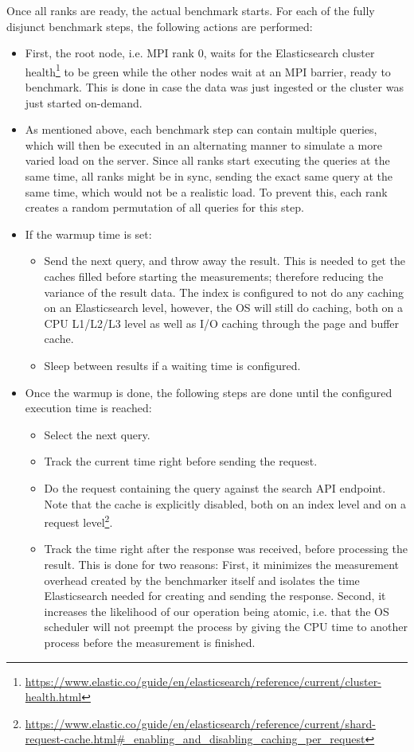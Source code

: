 Once all ranks are ready, the actual benchmark starts. For each of the fully disjunct benchmark steps, the following actions are performed:
\begin{itemize}
  \item First, the root node, i.e. \ac{MPI} rank 0, waits for the Elasticsearch cluster health\footnote{\url{https://www.elastic.co/guide/en/elasticsearch/reference/current/cluster-health.html}} to be green while the other nodes wait at an \ac{MPI} barrier, ready to benchmark. This is done in case the data was just ingested or the cluster was just started on-demand.
  \item As mentioned above, each benchmark step can contain multiple queries, which will then be executed in an alternating manner to simulate a more varied load on the server. Since all ranks start executing the queries at the same time, all ranks might be in sync, sending the exact same query at the same time, which would not be a realistic load. To prevent this, each rank creates a random permutation of all queries for this step.
  \item If the warmup time is set:
    \begin{itemize}
      \item Send the next query, and throw away the result. This is needed to get the caches filled before starting the measurements; therefore reducing the variance of the result data. The index is configured to not do any caching on an Elasticsearch level, however, the OS will still do caching, both on a CPU L1/L2/L3 level as well as I/O caching through the page and buffer cache.
      \item Sleep between results if a waiting time is configured.
    \end{itemize}
  \item Once the warmup is done, the following steps are done until the configured execution time is reached:
    \begin{itemize}
      \item Select the next query.
      \item Track the current time right before sending the request.
      \item Do the request containing the query against the search API endpoint. Note that the cache is explicitly disabled, both on an index level and on a request level\footnote{\url{https://www.elastic.co/guide/en/elasticsearch/reference/current/shard-request-cache.html\#_enabling_and_disabling_caching_per_request}}.
      \item Track the time right after the response was received, before processing the result. This is done for two reasons: First, it minimizes the measurement overhead created by the benchmarker itself and isolates the time Elasticsearch needed for creating and sending the response. Second, it increases the likelihood of our operation being atomic, i.e. that the OS scheduler will not preempt the process by giving the CPU time to another process before the measurement is finished.

\end{itemize}
\end{itemize}
